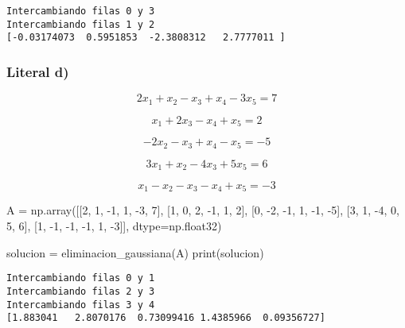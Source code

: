 \documentclass[
  letterpaper,
  DIV=11,
  numbers=noendperiod]{scrartcl}
\newenvironment{Shaded}{\begin{snugshade}}{\end{snugshade}}
\newcommand{\BuiltInTok}[1]{\textcolor[rgb]{0.00,0.23,0.31}{#1}}
\newcommand{\DecValTok}[1]{\textcolor[rgb]{0.68,0.00,0.00}{#1}}
\newcommand{\NormalTok}[1]{\textcolor[rgb]{0.00,0.23,0.31}{#1}}
\newcommand{\OperatorTok}[1]{\textcolor[rgb]{0.37,0.37,0.37}{#1}}
\begin{document}
\begin{verbatim}
Intercambiando filas 0 y 3
Intercambiando filas 1 y 2
[-0.03174073  0.5951853  -2.3808312   2.7777011 ]
\end{verbatim}

\subsubsection{Literal d)}\label{literal-d-2}

\[2x_1 + x_2 - x_3 + x_4 - 3x_5 = 7\]

\[x_1 + 2x_3 - x_4 + x_5 = 2\]

\[- 2x_2 - x_3 + x_4 - x_5 = -5\]

\[3x_1 + x_2 - 4x_3 + 5x_5 = 6\]

\[x_1 - x_2 - x_3 - x_4 + x_5= -3\]

\begin{Shaded}
\begin{Highlighting}[]

\NormalTok{A }\OperatorTok{=}\NormalTok{ np.array([[}\DecValTok{2}\NormalTok{, }\DecValTok{1}\NormalTok{, }\OperatorTok{{-}}\DecValTok{1}\NormalTok{, }\DecValTok{1}\NormalTok{, }\OperatorTok{{-}}\DecValTok{3}\NormalTok{, }\DecValTok{7}\NormalTok{],}
\NormalTok{              [}\DecValTok{1}\NormalTok{, }\DecValTok{0}\NormalTok{, }\DecValTok{2}\NormalTok{, }\OperatorTok{{-}}\DecValTok{1}\NormalTok{, }\DecValTok{1}\NormalTok{, }\DecValTok{2}\NormalTok{],}
\NormalTok{              [}\DecValTok{0}\NormalTok{, }\OperatorTok{{-}}\DecValTok{2}\NormalTok{, }\OperatorTok{{-}}\DecValTok{1}\NormalTok{, }\DecValTok{1}\NormalTok{, }\OperatorTok{{-}}\DecValTok{1}\NormalTok{, }\OperatorTok{{-}}\DecValTok{5}\NormalTok{],}
\NormalTok{              [}\DecValTok{3}\NormalTok{, }\DecValTok{1}\NormalTok{, }\OperatorTok{{-}}\DecValTok{4}\NormalTok{, }\DecValTok{0}\NormalTok{, }\DecValTok{5}\NormalTok{, }\DecValTok{6}\NormalTok{],}
\NormalTok{              [}\DecValTok{1}\NormalTok{, }\OperatorTok{{-}}\DecValTok{1}\NormalTok{, }\OperatorTok{{-}}\DecValTok{1}\NormalTok{, }\OperatorTok{{-}}\DecValTok{1}\NormalTok{, }\DecValTok{1}\NormalTok{, }\OperatorTok{{-}}\DecValTok{3}\NormalTok{]], dtype}\OperatorTok{=}\NormalTok{np.float32)}

\NormalTok{solucion }\OperatorTok{=}\NormalTok{ eliminacion\_gaussiana(A)}
\BuiltInTok{print}\NormalTok{(solucion)}
\end{Highlighting}
\end{Shaded}

\begin{verbatim}
Intercambiando filas 0 y 1
Intercambiando filas 2 y 3
Intercambiando filas 3 y 4
[1.883041   2.8070176  0.73099416 1.4385966  0.09356727]
\end{verbatim}
\end{document}
